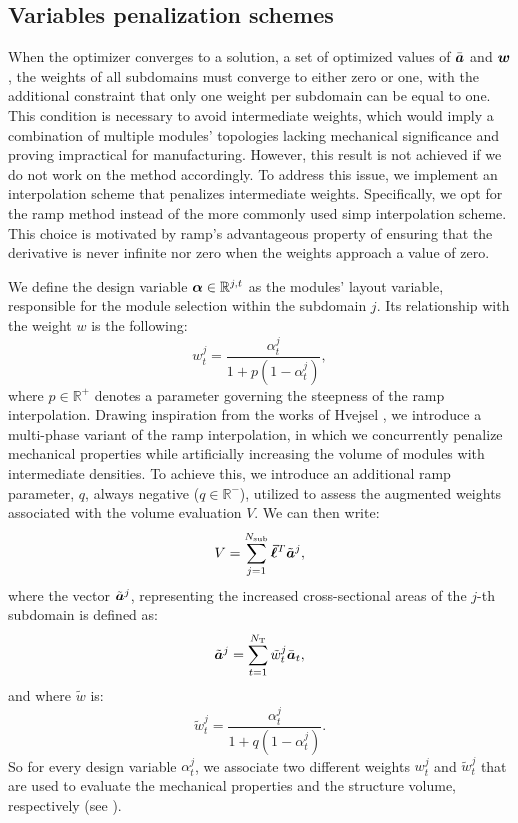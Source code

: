 \subsection{Variables penalization schemes}
When the optimizer converges to a solution, \ie a set of optimized values of $\bar{\bm{a}}$ and $\bm{w}$, the weights of all subdomains must converge to either zero or one, with the additional constraint that only one weight per subdomain can be equal to one. This condition is necessary to avoid intermediate weights, which would imply a combination of multiple modules' topologies lacking mechanical significance and proving impractical for manufacturing. However, this result is not achieved if we do not work on the method accordingly. To address this issue, we implement an interpolation scheme that penalizes intermediate weights. Specifically, we opt for the \gls{ramp} method  instead of the more commonly used \gls{simp} interpolation scheme. This choice is motivated by \gls{ramp}'s advantageous property of ensuring that the derivative is never infinite nor zero when the weights approach a value of zero.

We define the design variable $\bm{\alpha}\in\mathbb{R}^{j,t}$ as the modules' layout variable, responsible for the module selection within the subdomain $j$. Its relationship with the weight $w$ is the following:
\begin{equation}
    w_t^j = \frac{\alpha_t^j}{1+p(1-\alpha_t^j)},  
\end{equation}
where $p \in \mathbb{R}^+$ denotes a parameter governing the steepness of the \gls{ramp} interpolation. Drawing inspiration from the works of Hvejsel \etal {}, we introduce a multi-phase variant of the \gls{ramp} interpolation, in which we concurrently penalize mechanical properties while artificially increasing the volume of modules with intermediate densities. To achieve this, we introduce an additional \gls{ramp} parameter, $q$, always negative ($q \in \mathbb{R}^-$), utilized to assess the augmented weights associated with the volume evaluation $V$. We can then write:
\begin{equation}
    V = \sum_{j=1}^{N_{\text{sub}}}\bm{\bar{\ell}}^T\tilde{\bm{a}}^j,
\end{equation}
where the vector $\tilde{\bm{a}}^j$, representing the increased cross-sectional areas of the $j$-th subdomain is defined as:
\begin{equation}
    \tilde{\bm{a}}^j = \sum_{t=1}^{N_\text{T}} \tilde{w}_t^j \bar{\bm{a}}_t, 
\end{equation}
and where $\tilde{w}$ is:
\begin{equation}
    \tilde{w}_t^j = \frac{\alpha_t^j}{1+q(1-\alpha_t^j)}.    
\end{equation}
So for every design variable $\alpha_t^j$, we associate two different weights $w_t^j$ and $\tilde{w}_t^j$ that are used to evaluate the mechanical properties and the structure volume, respectively (see ).


